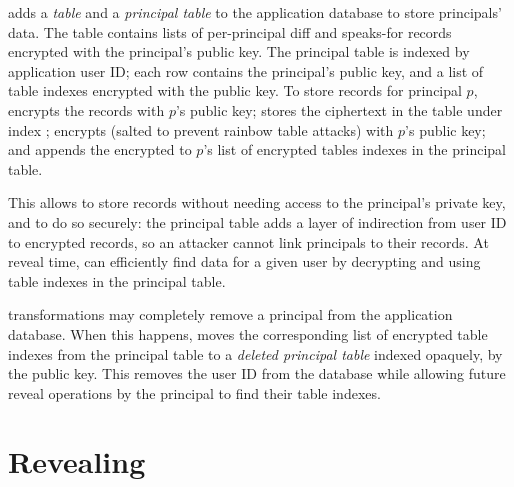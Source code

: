 \sys adds a \emph{\xx table} and a \emph{principal table} to the application
database to store principals' \xxed data.
%
The \xx table contains lists of per-principal diff and speaks-for records encrypted with the
principal's public key.
%
%
The principal table is indexed by application user ID; each row contains the
principal's public key, and a list of \xx table indexes encrypted with the
public key.
%
To store records for principal $p$, \sys \one{} encrypts the records with
$p$'s public key; \two{} stores the ciphertext in the \xx table under index
; \three{} encrypts  (salted to
prevent rainbow table attacks) with $p$'s public key; and \four{} appends the
encrypted  to $p$'s list of encrypted \xx tables indexes
in the principal table.

%
This allows \sys to store records without needing access to the principal's
private key, and to do so securely: the principal table adds a layer of
indirection from user ID to encrypted records, so an attacker cannot link
principals to their records.
%
At reveal time, \sys can efficiently find \xxed data for a given user
by decrypting and using \xx table indexes in the principal table.
%
%

%
\Xxing transformations may completely remove a principal from the
application database.
%
When this happens, \sys moves the corresponding list of encrypted \xx table
indexes from the principal table to a \emph{deleted principal table} indexed
opaquely, \eg by the public key.
%
This removes the user ID from the database while allowing future reveal
operations by the principal to find their \xx table indexes.
%

\section{Revealing}
\label{s:reveal}


